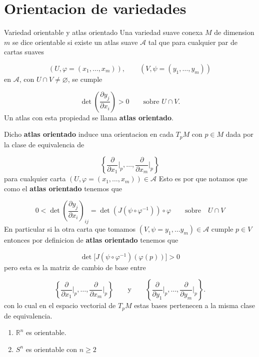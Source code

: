 \section{Orientacion de variedades}
\begin{bookdefinition}{Variedad orientable y atlas orientado}
Una variedad suave conexa $M$ de dimension $m$ se dice orientable si existe un atlas suave $\mathcal A$ tal que para cualquier par de cartas suaves

\[
(U,\varphi=(x_1,\ldots,x_m)),\qquad (V,\psi=(y_1,\ldots,y_m))
\]
en $\mathcal A$, con $U\cap V\ne\varnothing$, se cumple

\[
\det\left(\frac{\partial y_j}{\partial x_i}\right)>0\qquad \text{sobre }U\cap V.
\]
Un atlas con esta propiedad se llama \textbf{atlas orientado}.

\end{bookdefinition}
\begin{bookremark}{}
Dicho \textbf{atlas orientado} induce una orientacion en cada $T_{p}M$ con $p\in M$ dada por la clase de equivalencia de

\[
\left\{ \frac{\partial}{\partial x_{1}}\bigg|_{p},\ldots, \frac{\partial}{\partial x_{m}}\bigg|_{p}\right \}
\]
para cualquier carta $(U,\varphi=(x_{1},\ldots,x_{m}))\in \mathcal{A}$ Esto es por que notamos que como el \textbf{atlas orientado} tenemos que

\[
0<\det\left(\frac{\partial y_j}{\partial x_i}\right)_{ij}=\det(J(\psi\circ\varphi ^{-1}))\circ\varphi \qquad\text{sobre}\quad U\cap V
\]
En particular si la otra carta que tomamos $(V,\psi=y_{1},\ldots y_{m})\in \mathcal A$ cumple $p\in V$ entonces por definicion de \textbf{atlas orientado} tenemos que

\[
\det \big[ J(\psi\circ\varphi ^{-1})(\varphi(p))\big]>0
\]
pero esta es la matriz de cambio de base entre

\[
\left\{\frac{\partial}{\partial x_1}\bigg|_p,\ldots,\frac{\partial}{\partial x_m}\bigg|_p\right\}\qquad\text{y}\qquad \left\{\frac{\partial}{\partial y_1}\bigg|_p,\ldots,\frac{\partial}{\partial y_m}\bigg|_p\right\}.
\]
con lo cual en el espacio vectorial de $T_{p}M$ estas bases pertenecen a la misma clase de equivalencia.

\end{bookremark}
\begin{bookexample}{}
\begin{enumerate}
\item $\mathbb R^n$ es orientable.
\item $S^n$ es orientable con $n\geq 2$
\end{enumerate}
\end{bookexample}
